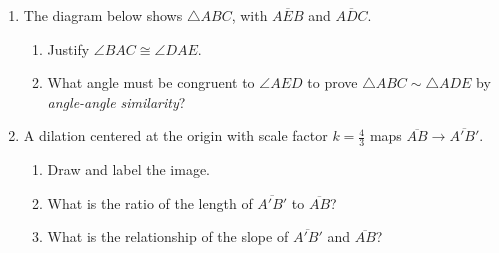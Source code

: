 \begin{enumerate}
\item The diagram below shows $\triangle ABC$, with $\overline{AEB}$ and $\overline{ADC}$.
  \begin{multicols}{2}
    \begin{enumerate}
      \item Justify $\angle BAC \cong \angle DAE$.
      \item What angle must be congruent to $\angle AED$ to prove $\triangle ABC \sim \triangle ADE$ by \emph{angle-angle similarity}? \vspace{3cm}
    \end{enumerate}
  \end{multicols}

\newpage
\item A dilation centered at the origin with scale factor $k=\frac{4}{3}$ maps $\overline{AB} \rightarrow \overline{A'B'}$. 
  \begin{multicols}{2}
    \begin{enumerate}
      \item Draw and label the image.
      \item What is the ratio of the length of $\overline{A'B'}$ to $\overline{AB}$?
      \item What is the relationship of the slope of $\overline{A'B'}$ and $\overline{AB}$?
      \begin{flushright}
      \end{flushright}
    \end{enumerate}
    \end{multicols} \vspace{1cm}
    

\end{enumerate}
